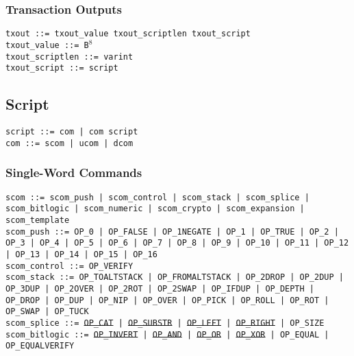 \documentclass{article}
\begin{document}
\subsubsection{Transaction Outputs}
\noindent
\texttt{txout ::= txout\_value txout\_scriptlen txout\_script  } \\
\texttt{txout\_value ::= B$^8$} \\
\texttt{txout\_scriptlen ::= varint} \\
\texttt{txout\_script ::= script}

\subsection{Script}
\noindent
\texttt{script ::= com | com script} \\
\texttt{com ::= scom | ucom | dcom}

\subsubsection{Single-Word Commands}
\noindent \hangindent=0.7cm
\texttt{scom ::=
  scom\_push | scom\_control | scom\_stack | scom\_splice | scom\_bitlogic |
  scom\_numeric | scom\_crypto | scom\_expansion | scom\_template} \\

\noindent \hangindent=0.7cm
\texttt{scom\_push ::=
  OP\_0 | OP\_FALSE | OP\_1NEGATE | OP\_1 | OP\_TRUE |
  OP\_2 | OP\_3 | OP\_4 | OP\_5 | OP\_6 | OP\_7 | OP\_8 | OP\_9 | OP\_10 |
  OP\_11 | OP\_12 | OP\_13 | OP\_14 | OP\_15 | OP\_16} \\

\noindent \hangindent=0.7cm
\texttt{scom\_control ::= OP\_VERIFY} \\

\noindent \hangindent=0.7cm
\texttt{scom\_stack ::=
  OP\_TOALTSTACK | OP\_FROMALTSTACK | OP\_2DROP | OP\_2DUP | OP\_3DUP |
  OP\_2OVER | OP\_2ROT | OP\_2SWAP | OP\_IFDUP | OP\_DEPTH | OP\_DROP | OP\_DUP
  | OP\_NIP | OP\_OVER | OP\_PICK | OP\_ROLL | OP\_ROT | OP\_SWAP | OP\_TUCK}
  \\

\noindent \hangindent=0.7cm
\texttt{scom\_splice ::=
  \sout{OP\_CAT }| \sout{OP\_SUBSTR} | \sout{OP\_LEFT} | \sout{OP\_RIGHT} |
  OP\_SIZE} \\

\noindent \hangindent=0.7cm
\texttt{scom\_bitlogic ::=
  \sout{OP\_INVERT} | \sout{OP\_AND} | \sout{OP\_OR} | \sout{OP\_XOR} |
  OP\_EQUAL | OP\_EQUALVERIFY} \\
\end{document}
